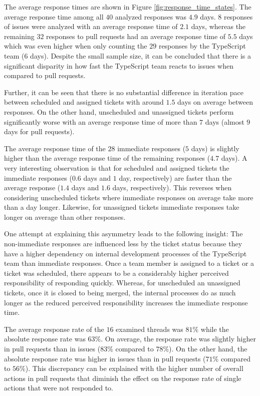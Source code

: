 \documentclass[12pt]{scrartcl}
\begin{document}
The average response times are shown in Figure \ref{fig:response_time_states}. The average response time among all $40$ analyzed responses was $4.9$ days. $8$ responses of issues were analyzed with an average response time of $2.1$ days, whereas the remaining $32$ responses to pull requests had an average response time of $5.5$ days which was even higher when only counting the $29$ responses by the TypeScript team ($6$ days). Despite the small sample size, it can be concluded that there is a significant disparity in how fast the TypeScript team reacts to issues when compared to pull requests.

Further, it can be seen that there is no substantial difference in iteration pace between scheduled and assigned tickets with around $1.5$ days on average between responses. On the other hand, unscheduled and unassigned tickets perform significantly worse with an average response time of more than $7$ days (almost $9$ days for pull requests).

The average response time of the $28$ immediate responses ($5$ days) is slightly higher than the average response time of the remaining responses ($4.7$ days). A very interesting observation is that for scheduled and assigned tickets the immediate responses ($0.6$ days and $1$ day, respectively) are faster than the average response ($1.4$ days and $1.6$ days, respectively). This reverses when considering unscheduled tickets where immediate responses on average take more than a day longer. Likewise, for unassigned tickets immediate responses take longer on average than other responses.

One attempt at explaining this asymmetry leads to the following insight: The non-immediate responses are influenced less by the ticket status because they have a higher dependency on internal development processes of the TypeScript team than immediate responses. Once a team member is assigned to a ticket or a ticket was scheduled, there appears to be a considerably higher perceived responsibility of responding quickly. Whereas, for unscheduled an unassigned tickets, once it is closed to being merged, the internal processes do as much longer as the reduced perceived responsibility increases the immediate response time.

The average response rate of the $16$ examined threads was $81\%$ while the absolute response rate was $63\%$. On average, the response rate was slightly higher in pull requests than in issues ($83\%$ compared to $78\%$). On the other hand, the absolute response rate was higher in issues than in pull requests ($71\%$ compared to $56\%$). This discrepancy can be explained with the higher number of overall actions in pull requests that diminish the effect on the response rate of single actions that were not responded to.
\end{document}
